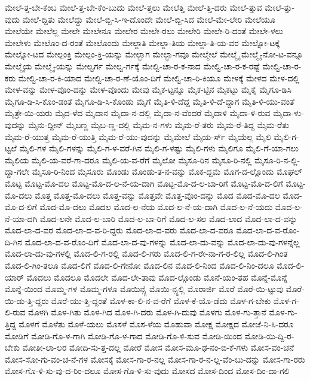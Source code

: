 {ಮೇಲೆ-ತ್ತ-ಬೇ-ಕೆಂಬ
ಮೇಲೆ-ತ್ತ-ಬೇ-ಕೆಂ-ಬುದು
ಮೇಲೆ-ತ್ತಲು
ಮೇಲೆತ್ತಿ
ಮೇಲೆ-ತ್ತಿ-ದರು
ಮೇಲೆ-ತ್ತುವ
ಮೇಲೆ-ತ್ತು-ವುದು
ಮೇಲೆ-ದ್ದಿತು
ಮೇಲೆದ್ದು
ಮೇಲೆ-ಬ್ಬಿ-ಸಿ-ಇ-ದೊಂದೇ
ಮೇಲೆ-ಬ್ಬಿ-ಸಿದ
ಮೇಲೆ-ಮೇ-ಲೇರಿ
ಮೇಲೆಯೂ
ಮೇಲೆಯೇ
ಮೇಲೆಲ್ಲ
ಮೇಲೇ
ಮೇಲೇನೂ
ಮೇಲೇರ
ಮೇಲೇ-ರಲು
ಮೇಲೇರಿ
ಮೇಲೇ-ರಿ-ದಂತೆ
ಮೇಲೇ-ಳಲು
ಮೇಲೇಳು
ಮೇಲೊಂ-ದ-ರಂತೆ
ಮೇಲೊಂದು
ಮೇಲ್ಜಾತಿ
ಮೇಲ್ಜಾ-ತಿಯ
ಮೇಲ್ಜಾ-ತಿ-ಯ-ವರ
ಮೇಲ್ನೋ-ಟಕ್ಕೆ
ಮೇಲ್ನೋ-ಟದ
ಮೇಲ್ಪಂಕ್ತಿ
ಮೇಲ್ಪಂ-ಕ್ತಿ-ಯನ್ನು
ಮೇಲ್ಭಾಗ
ಮೇಲ್ಭಾ-ಗವೂ
ಮೇಲ್ಮೇಲೆ
ಮೇಲ್ಮೈ
ಮೇಲ್ಮೈ-ನೋ-ಟ-ವನ್ನೂ
ಮೇಲ್ಮೈಯ
ಮೇಲ್ಮೈ-ಯನ್ನು
ಮೇಲ್ವರ್ಗ
ಮೇಲ್ವ-ರ್ಗಕ್ಕೆ
ಮೇಲ್ವಿ-ಚಾ-ರ-ಕ-ನಾದ
ಮೇಲ್ವಿ-ಚಾ-ರ-ಕ-ರಷ್ಟೆ
ಮೇಲ್ವಿ-ಚಾ-ರ-ಕರು
ಮೇಲ್ವಿ-ಚಾ-ರ-ಕಿ-ಯಾದ
ಮೇಲ್ವಿ-ಚಾ-ರ-ಣೆ-ಯೊಂ-ದಿಗೆ
ಮೇಲ್ವಿ-ಚಾ-ರಿ-ಕಿಯೂ
ಮೇಳಕ್ಕೆ
ಮೇಳದ
ಮೇಳ-ದಲ್ಲಿ
ಮೇಳ-ವನ್ನು
ಮೇಳ-ವೊಂ-ದನ್ನು
ಮೇಳ-ವೊಂದು
ಮೇವು
ಮೈಕ-ಟ್ಟನ್ನೂ
ಮೈಕ-ಟ್ಟಿನ
ಮೈಕಟ್ಟು
ಮೈಕೈ
ಮೈಗೂ-ಡಿಸಿ
ಮೈಗೂ-ಡಿ-ಸಿ-ಕೊಂ-ಡಂತೆ
ಮೈಗೂ-ಡಿ-ಸಿ-ಕೊಂಡು
ಮೈಗೆ
ಮೈತಿ-ಳಿ-ದೆದ್ದ
ಮೈತಿ-ಳಿ-ದೆ-ದ್ದಾಗ
ಮೈತಿ-ಳಿ-ಯು-ವಂತೆ
ಮೈತ್ರೇ-ಯಿ-ಯರು
ಮೈದ-ಳೆದ
ಮೈದಾನ
ಮೈದಾ-ನ-ದಲ್ಲಿ
ಮೈದಾ-ನ-ವೆಂದರೆ
ಮೈದಾಳಿ
ಮೈದಾ-ಳಿ-ರುವ
ಮೈದಾ-ಳು-ವುದನ್ನು
ಮೈನು-ದ್ದೀನ್
ಮೈಬಣ್ಣ
ಮೈಬ-ಣ್ಣ-ದಲ್ಲಿ
ಮೈಮ-ನ-ಗಳು
ಮೈಮ-ರೆ-ತರು
ಮೈಮ-ರೆ-ತಿದ್ದ
ಮೈಮ-ರೆತು
ಮೈಮ-ರೆ-ಯುತ್ತ
ಮೈಮ-ರೆ-ಯುತ್ತಿ
ಮೈಮ-ರೆ-ಯು-ವುದನ್ನು
ಮೈಮೇಲೆ
ಮೈಯ-ರ್ಸ್
ಮೈಯೆಲ್ಲ
ಮೈಲಿ
ಮೈಲಿ-ಗ-ಟ್ಟಲೆ
ಮೈಲಿ-ಗಳ
ಮೈಲಿ-ಗಳನ್ನು
ಮೈಲಿ-ಗ-ಳ-ವರೆ-ಗಿನ
ಮೈಲಿ-ಗ-ಳಷ್ಟು
ಮೈಲಿ-ಗಳು
ಮೈಲಿಗೂ
ಮೈಲಿ-ಗೆ-ಯಾ-ಗಲು
ಮೈಲಿಯ
ಮೈಲಿ-ಯ-ವರೆ-ಗಾ-ದರೂ
ಮೈಲಿ-ಯ-ವ-ರೆಗೆ
ಮೈಲೋ
ಮೈಸೂ-ರಿನ
ಮೈಸೂ-ರಿ-ನಲ್ಲಿ
ಮೈಸೂ-ರಿ-ನ-ಲ್ಲಿ-ದ್ದಾ-ಗಲೇ
ಮೈಸೂ-ರಿ-ನಿಂದ
ಮೈಸೂರು
ಮೊಂಡು
ಮೊಂಡು-ತ-ನ-ವನ್ನು
ಮೊಕ-ದ್ದಮೆ
ಮೊಗ-ದ-ಲ್ಲೊಂದು
ಮೊಘಲ್
ಮೊಟ್ಟ
ಮೊಟ್ಟ-ಮೊ-ದಲ
ಮೊಟ್ಟ-ಮೊ-ದ-ಲ-ನೆ-ಯ-ದಾಗಿ
ಮೊಟ್ಟ-ಮೊ-ದ-ಲ-ಬಾ-ರಿಗೆ
ಮೊಟ್ಟ-ಮೊ-ದ-ಲಿಗೆ
ಮೊಟ್ಟ-ಮೊ-ದಲು
ಮೊತ್ತ
ಮೊತ್ತ-ಮೊ-ದಲು
ಮೊತ್ತ-ವನ್ನು
ಮೊತ್ತವೇ
ಮೊತ್ತ-ವೊಂ-ದನ್ನು
ಮೊದ
ಮೊದ-ಮೊ-ದಲ
ಮೊದ-ಮೊ-ದ-ಲಿಗೆ
ಮೊದ-ಮೊ-ದಲು
ಮೊದಲ
ಮೊದ-ಲ-ನೆಯ
ಮೊದ-ಲ-ನೆ-ಯ-ದಾಗಿ
ಮೊದ-ಲ-ನೆ-ಯದು
ಮೊದ-ಲ-ನೆ-ಯಾ-ದಗಿ
ಮೊದ-ಲನೇ
ಮೊದ-ಲ-ಬಾರಿ
ಮೊದ-ಲ-ಬಾ-ರಿಗೆ
ಮೊದ-ಲ-ಸಲ
ಮೊದ-ಲಾದ
ಮೊದ-ಲಾ-ದ-ವನ್ನು
ಮೊದ-ಲಾ-ದ-ವರ
ಮೊದ-ಲಾ-ದ-ವ-ರಿ-ದ್ದರು
ಮೊದ-ಲಾ-ದ-ವರು
ಮೊದ-ಲಾ-ದ-ವರೂ
ಮೊದ-ಲಾ-ದ-ವ-ರೊಂ-ದಿ-ಗಿನ
ಮೊದ-ಲಾ-ದ-ವ-ರೊಂ-ದಿಗೆ
ಮೊದ-ಲಾ-ದ-ವು-ಗಳನ್ನು
ಮೊದ-ಲಾ-ದು-ವನ್ನು
ಮೊದ-ಲಾ-ದು-ವು-ಗಳನ್ನೆಲ್ಲ
ಮೊದ-ಲಾ-ದು-ವು-ಗಳಲ್ಲಿ
ಮೊದ-ಲಿ-ಗ-ರಲ್ಲಿ
ಮೊದ-ಲಿ-ಗರು
ಮೊದ-ಲಿ-ಗ-ರೇ-ನಾ-ಗ-ರ-ಲಿಲ್ಲ
ಮೊದ-ಲಿ-ಗಿಂತ
ಮೊದ-ಲಿ-ಗಿಂ-ತಲೂ
ಮೊದ-ಲಿಗೆ
ಮೊದ-ಲಿ-ಗೇನೋ
ಮೊದ-ಲಿನ
ಮೊದ-ಲಿ-ನಿಂದ
ಮೊದ-ಲಿ-ನಿಂ-ದಲೂ
ಮೊದ-ಲಿ-ಯಾರ್
ಮೊದಲು
ಮೊದಲೂ
ಮೊದಲೇ
ಮೊದ-ಲೇ-ತಾವು
ಮೊದ-ಲ್ಗೊಂಡು
ಮೊನೆ-ಯಂ-ತಹ
ಮೊನ್ನೆ-ಮೊನ್ನೆ
ಮೊನ್ನೆ-ಯಿಂದ
ಮೊಮ್ಮ-ಗಳ
ಮೊಮ್ಮ-ಗಳೂ
ಮೊಯಿನ್ಸ್ಗೆ
ಮೊಯಿ-ನ್ಸ್ನಲ್ಲಿ
ಮೊರಾರ್ಜಿ
ಮೊರೆ
ಮೊರೆ-ಯಿ-ಟ್ಟುವು
ಮೊರೆ-ಯಿ-ಡು-ತ್ತಿ-ದ್ದರು
ಮೊರೆ-ಯು-ತ್ತಿ-ದ್ದಂತೆ
ಮೊಳ-ಕಾ-ಲಿ-ನ-ವ-ರೆಗೆ
ಮೊಳ-ಕೆ-ಯೊ-ಡೆದು
ಮೊಳ-ಗ-ಬೇಕು
ಮೊಳ-ಗ-ಲಿ-ರುವ
ಮೊಳಗಿ
ಮೊಳ-ಗಿತು
ಮೊಳ-ಗಿದ
ಮೊಳ-ಗಿ-ದರು
ಮೊಳ-ಗಿ-ದುವು
ಮೊಳಗು
ಮೊಳ-ಗು-ತ್ತಾನೆ
ಮೊಳ-ಗು-ತ್ತಿದ್ದ
ಮೊಳಗೆ
ಮೊಳೆತು
ಮೊಳೆ-ಯಲು
ಮೊಸಳೆ
ಮೊಸ-ಳೆಯ
ಮೊಹುವಾ
ಮೋಕ್ಷ
ಮೋಕ್ಷದ
ಮೋಜೆ-ನಿ-ಸಿ-ದರೂ
ಮೋಡಿಗೆ
ಮೋಡಿ-ಗೊ-ಳ-ಗಾಗಿ
ಮೋಡಿ-ಗೊ-ಳ-ಗಾದ
ಮೋಡಿ-ಗೊ-ಳಿ-ಸುವ
ಮೋಡಿ-ಯಿಂದ
ಮೋಡಿ-ಯಿ-ದ್ದಿ-ರ-ಬೇಕು
ಮೋತೀ-ಲಾ-ಲರ
ಮೋದಿ-ಸು-ತ್ತ-ದಲ್ಲ
ಮೋರೆ
ಮೋಸ
ಮೋಸ-ಮೂ-ಢ-ನಂ-ಬಿ-ಕೆ-ಗಳು
ಮೋಸ-ವಂ-ಚನೆ
ಮೋಸ-ಸೋ-ಗು-ವಂ-ಚ-ನೆ-ಗಳ
ಮೋಸಕ್ಕೆ
ಮೋಸ-ಗಾ-ರ-ನಲ್ಲ
ಮೋಸ-ಗಾ-ರ-ನ-ಲ್ಲ-ವೆಂ-ಬು-ದನ್ನು
ಮೋಸ-ಗಾ-ರರು
ಮೋಸ-ಗೊ-ಳಿ-ಸು-ವು-ದ-ರಿಂ-ದಲೂ
ಮೋಸ-ಗೊ-ಳಿ-ಸು-ವುದು
ಮೋಸದ
ಮೋಸ-ದಿಂದ
ಮೋಸ-ದಿಂ-ದಾ-ಗಲಿ
}
